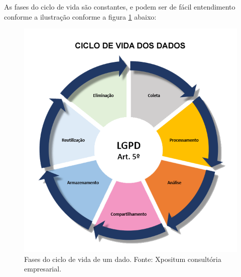 \documentclass[
	12pt,				%
	openright,			%
	oneside,			%
	a4paper,			%
	english,			%
	french,				%
	spanish,			%
	brazil,				%
	]{abntex2}
\begin{document}
As fases do ciclo de vida são constantes, e podem ser de fácil entendimento conforme a ilustração conforme a figura \ref{fig: 01CicloDeVida} abaixo:

\begin{figure}[ht]
    \centering
    \includegraphics[width=5.0in]{Images/01CicloDeVida.png}
    \caption{Fases do ciclo de vida de um dado. Fonte: Xpositum consultória empresarial.}
    \label{fig: 01CicloDeVida}
\end{figure}
\end{document}
